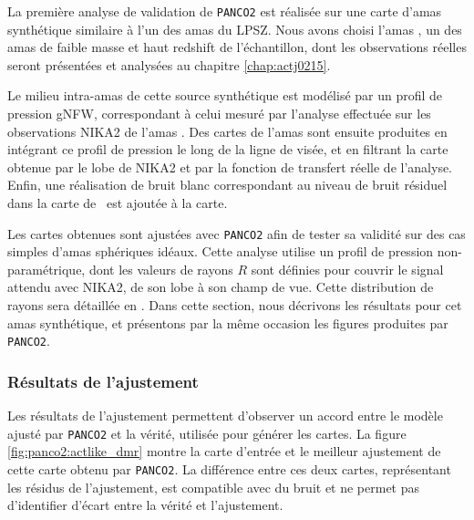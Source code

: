La première analyse de validation de \texttt{PANCO2} est réalisée sur une carte d'amas synthétique similaire à l'un des amas du LPSZ.
Nous avons choisi l'amas \act, un des amas de faible masse et haut redshift de l'échantillon, dont les observations réelles seront présentées et analysées au chapitre \ref{chap:actj0215}.

Le milieu intra-amas de cette source synthétique est modélisé par un profil de pression gNFW, correspondant à celui mesuré par l'analyse effectuée sur les observations NIKA2 de l'amas \cite{keruzore_exploiting_2020}.
Des cartes de l'amas sont ensuite produites en intégrant ce profil de pression le long de la ligne de visée, et en filtrant la carte obtenue par le lobe de NIKA2 et par la fonction de transfert réelle de l'analyse.
Enfin, une réalisation de bruit blanc correspondant au niveau de bruit résiduel dans la carte de \act\ est ajoutée à la carte.

Les cartes obtenues sont ajustées avec \texttt{PANCO2} afin de tester sa validité sur des cas simples d'amas sphériques idéaux.
Cette analyse utilise un profil de pression non-paramétrique, dont les valeurs de rayons $R$ sont définies pour couvrir le signal attendu avec NIKA2, de son lobe à son champ de vue.
Cette distribution de rayons sera détaillée en .
Dans cette section, nous décrivons les résultats pour cet amas synthétique, et présentons par la même occasion les figures produites par \texttt{PANCO2}.

\subsubsection{Résultats de l'ajustement} %
Les résultats de l'ajustement permettent d'observer un accord entre le modèle ajusté par \texttt{PANCO2} et la vérité, utilisée pour générer les cartes.
La figure \ref{fig:panco2:actlike_dmr} montre la carte d'entrée et le meilleur ajustement de cette carte obtenu par \texttt{PANCO2}.
La différence entre ces deux cartes, représentant les résidus de l'ajustement, est compatible avec du bruit et ne permet pas d'identifier d'écart entre la vérité et l'ajustement.

